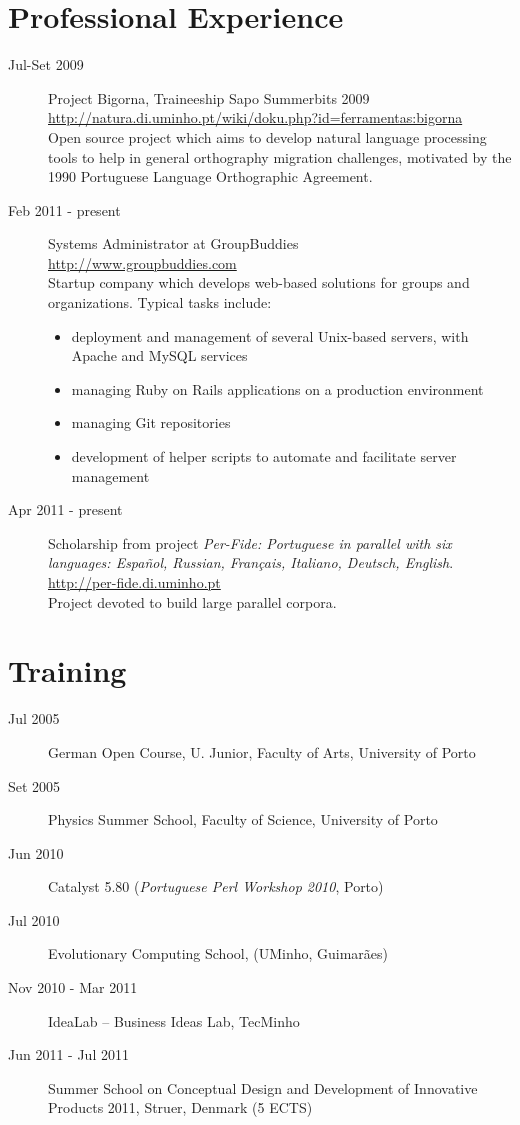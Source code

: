 \documentclass{article}
\begin{document}
\section{Professional Experience}
\begin{description}
\item [Jul-Set 2009] Project Bigorna, Traineeship Sapo Summerbits 2009\\
\url{http://natura.di.uminho.pt/wiki/doku.php?id=ferramentas:bigorna}\\
Open source project which aims to develop natural language processing tools to help in general orthography migration challenges, motivated by the 1990 Portuguese Language Orthographic Agreement.
\item [Feb 2011 - present] Systems Administrator at GroupBuddies\\
\url{http://www.groupbuddies.com}\\
Startup company which develops web-based solutions for groups and organizations. Typical tasks include:
\begin{itemize}
	\item deployment and management of several Unix-based servers, with Apache and MySQL services
	\item managing Ruby on Rails applications on a production environment
	\item managing Git repositories
	\item development of helper scripts to automate and facilitate server management
	\end{itemize}
\item [Apr 2011 - present] Scholarship from project \textit{Per-Fide: Portuguese in parallel with six languages: Español, Russian, Français, Italiano, Deutsch, English}.\\
\url{http://per-fide.di.uminho.pt}\\
Project devoted to build large parallel corpora.

\end{description}


\section {Training}
\begin {description}
\item [Jul 2005] German Open Course, U. Junior, Faculty of Arts, University of Porto
\item [Set 2005] Physics Summer School, Faculty of Science, University of Porto
\item [Jun 2010] Catalyst 5.80 (\textit{Portuguese Perl Workshop 2010}, Porto)
\item [Jul 2010] Evolutionary Computing School, (UMinho, Guimarães)
\item [Nov 2010 - Mar 2011] IdeaLab -- Business Ideas Lab, TecMinho
\item [Jun 2011 - Jul 2011] Summer School on Conceptual Design and Development of Innovative Products 2011, Struer, Denmark (5 ECTS)
\end{description}
\end{document}
